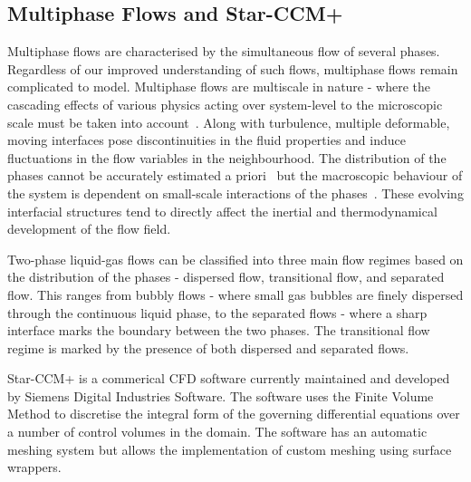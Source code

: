 \subsection{Multiphase Flows and Star-CCM+}
Multiphase flows are characterised by the simultaneous flow of several phases. Regardless of our 
 improved understanding 
 of such flows, multiphase flows remain complicated to model. Multiphase flows are 
 multiscale in nature - where 
 the cascading effects of various physics acting over 
 system-level to the microscopic scale must be taken into account~\cite{ishiiThermoFluidDynamicsTwoPhase2011}. 
 Along with turbulence, multiple deformable, moving interfaces pose discontinuities 
 in the fluid properties and induce fluctuations in the flow variables in the neighbourhood. 
 The distribution of the phases cannot be accurately estimated
 a priori~\cite{yadigarogluNatureMultiphaseFlows2018} but the macroscopic 
 behaviour of the system is dependent on small-scale interactions of the 
 phases~\cite{hanrattyPhysicsGasLiquid}. These evolving interfacial structures tend
 to directly affect the inertial and thermodynamical development of the flow field.~\cite{ishiiThermoFluidDynamicsTwoPhase2011}

Two-phase liquid-gas flows can be classified into three main flow regimes based on the 
 distribution of the phases - dispersed flow, transitional flow, and separated flow.
 This ranges from bubbly flows - where small gas bubbles are finely dispersed through the
 continuous liquid phase, to the separated flows - where a sharp interface
 marks the boundary between the two phases.
 The transitional flow regime is marked by the presence of both dispersed and 
 separated flows.~\cite{yadigarogluNatureMultiphaseFlows2018}

Star-CCM+ is a commerical CFD software currently maintained and developed 
 by Siemens Digital Industries Software. The software uses the Finite Volume Method to
 discretise the integral form of the governing differential equations over a number 
 of control volumes in the domain. The software has an automatic meshing system but allows
 the implementation of custom meshing using surface wrappers.~\cite{star-ccm+}

